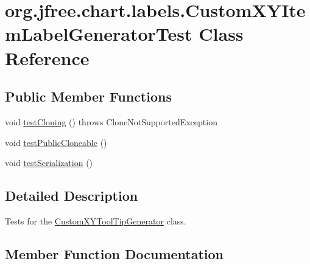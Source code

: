 \hypertarget{classorg_1_1jfree_1_1chart_1_1labels_1_1_custom_x_y_item_label_generator_test}{}\section{org.\+jfree.\+chart.\+labels.\+Custom\+X\+Y\+Item\+Label\+Generator\+Test Class Reference}
\label{classorg_1_1jfree_1_1chart_1_1labels_1_1_custom_x_y_item_label_generator_test}
\subsection*{Public Member Functions}
\begin{DoxyCompactItemize}
\item 
void \mbox{\hyperlink{classorg_1_1jfree_1_1chart_1_1labels_1_1_custom_x_y_item_label_generator_test_ae8d9b420f95839378cf363709ecd72e6}{test\+Cloning}} ()  throws Clone\+Not\+Supported\+Exception 
\item 
void \mbox{\hyperlink{classorg_1_1jfree_1_1chart_1_1labels_1_1_custom_x_y_item_label_generator_test_aff3a091853cf3bb6dc28fd7d4cfc102f}{test\+Public\+Cloneable}} ()
\item 
void \mbox{\hyperlink{classorg_1_1jfree_1_1chart_1_1labels_1_1_custom_x_y_item_label_generator_test_a562229c22b2f5327001c60b9ab709b2e}{test\+Serialization}} ()
\end{DoxyCompactItemize}


\subsection{Detailed Description}
Tests for the \mbox{\hyperlink{classorg_1_1jfree_1_1chart_1_1labels_1_1_custom_x_y_tool_tip_generator}{Custom\+X\+Y\+Tool\+Tip\+Generator}} class. 

\subsection{Member Function Documentation}
\mbox{\label{classorg_1_1jfree_1_1chart_1_1labels_1_1_custom_x_y_item_label_generator_test_ae8d9b420f95839378cf363709ecd72e6}} 
